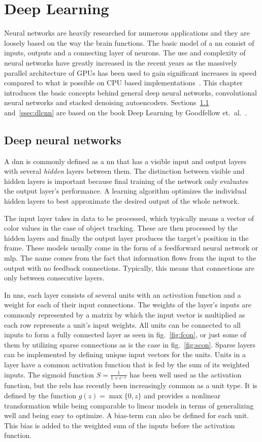 \section{Deep Learning}
Neural networks are heavily researched for numerous applications and they are loosely based on the way the brain functions. The basic model of a \ac{nn} consist of inputs, outputs and a connecting layer of neurons. The use and complexity of neural networks have greatly increased in the recent years as the massively parallel architecture of GPUs has been used to gain significant increases in speed compared to what is possible on CPU based implementations~\cite{NIPS_IMAGENET}. This chapter introduces the basic concepts behind general deep neural networks, convolutional neural networks and stacked denoising autoencoders. Sections~\ref{ssec:dldnn} and~\ref{ssec:dlcnn} are based on the book Deep Learning by Goodfellow et.~al.~\cite{DEEP_LEARNING}.

\subsection{Deep neural networks}\label{ssec:dldnn}
A \ac{dnn} is commonly defined as a \ac{nn} that has a visible input and output layers with several \textit{hidden} layers between them. The distinction between visible and hidden layers is important because final training of the network only evaluates the output layer's performance. A learning algorithm optimizes the individual hidden layers to best approximate the desired output of the whole network.

The input layer takes in data to be processed, which typically means a vector of color values in the case of object tracking. These are then processed by the hidden layers and finally the output layer produces the target's position in the frame. These models usually come in the form of a feedforward neural network or \ac{mlp}. The name comes from the fact that information flows from the input to the output with no feedback connections. Typically, this means that connections are only between consecutive layers.

In \ac{nn}s, each layer consists of several units with an activation function and a weight for each of their input connections. The weights of the layer's inputs are commonly represented by a matrix by which the input vector is multiplied as each row represents a unit's input weights. All units can be connected to all inputs to form a fully connected layer as seen in fig.~\ref{fig:fcon}, or just some of them by utilizing sparse connections as is the case in fig.~\ref{fig:scon}. Sparse layers can be implemented by defining unique input vectors for the units. Units in a layer have a common activation function that is fed by the sum of its weighted inputs. The sigmoid function $S = \frac{1}{1 + e^{-x}}$ has been well used as the activation function, but the \ac{relu} has recently been increasingly common as a unit type. It is defined by the function $g(z) = \max\{0,z\}$ and provides a nonlinear transformation while being comparable to linear models in terms of generalizing well and being easy to optimize. A bias-term can also be defined for each unit. This bias is added to the weighted sum of the inputs before the activation function.

